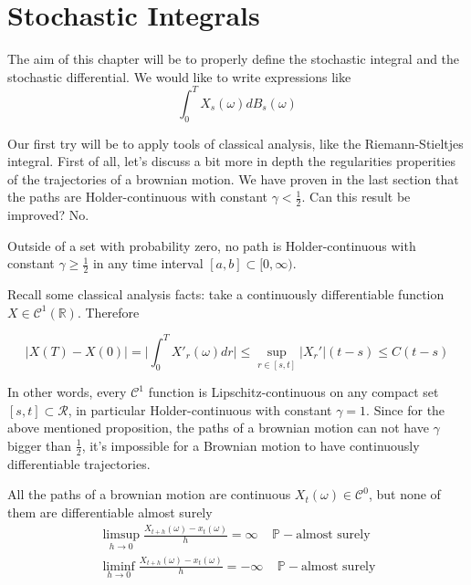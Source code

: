 \section{Stochastic Integrals}
The aim of this chapter will be to properly define the stochastic integral and the stochastic differential. We would like to write expressions like 
\begin{equation*}
    \int_0^T X_s(\omega) dB_s(\omega)
\end{equation*}

Our first try will be to apply tools of classical analysis, like the Riemann-Stieltjes integral. First of all, let's discuss a bit more in depth the regularities properities of the trajectories of a brownian motion. We have proven in the last section that the paths are Holder-continuous with constant $\gamma < \frac{1}{2}$. Can this result be improved? No.
\begin{proposition}
    Outside of a set with probability zero, no path is Holder-continuous with constant $\gamma \geq \frac{1}{2}$ in any time interval $[a,b] \subset [0,\infty)$. 
\end{proposition}

Recall some classical analysis facts: take a continuously differentiable function $X \in \mathcal{C}^1(\mathbb{R})$. Therefore 

\begin{equation*}
    \big\vert X(T) - X(0) \big\vert = \Bigg\vert \int_0^T X'_r(\omega) dr \Bigg\vert \leq \sup_{r \in [s,t]} \big\vert X_r' \big\vert (t-s) \leq C (t-s)
\end{equation*}

In other words, every $\mathcal{C}^1$ function is Lipschitz-continuous on any compact set $[s,t] \subset \mathcal{R}$, in particular Holder-continuous with constant $\gamma = 1$. Since for the above mentioned proposition, the paths of a brownian motion can not have $\gamma$ bigger than $\frac{1}{2}$, it's impossible for a Brownian motion to have continuously differentiable trajectories. 

\begin{theorem}
    All the paths of a brownian motion are continuous $X_t(\omega) \in \mathcal{C}^0$, but none of them are differentiable almost surely 
    \begin{gather*}
        \limsup_{h \to 0} \frac{X_{t+h}(\omega)-x_t(\omega)}{h} = \infty \;\;\;\; \mathbb{P}-\text{almost surely} \\
        \liminf_{h \to 0} \frac{X_{t+h}(\omega)-x_t(\omega)}{h} = -\infty \;\;\;\; \mathbb{P}-\text{almost surely}
    \end{gather*}
\end{theorem}

